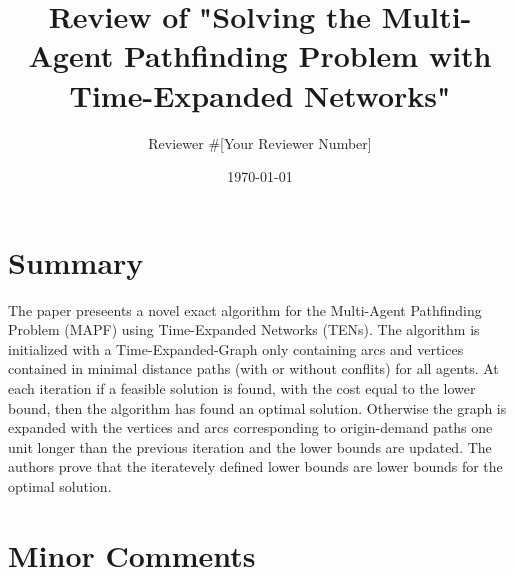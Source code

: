 \documentclass{article}
\begin{document}
\title{Review of "Solving the Multi-Agent Pathfinding Problem with Time-Expanded Networks"}
\author{Reviewer \#[Your Reviewer Number]}
\date{\today}

\maketitle

\section*{Summary}

The paper preseents a novel exact algorithm for the Multi-Agent Pathfinding Problem (MAPF) using Time-Expanded Networks (TENs).
The algorithm is initialized with a Time-Expanded-Graph only containing arcs and vertices contained in minimal distance paths (with or without conflits) for all agents.
At each iteration if a feasible solution is found, with the cost equal to the lower bound, then the algorithm has found an optimal solution. 
Otherwise the graph is expanded with the vertices and arcs corresponding to origin-demand paths one unit longer than the previous iteration and the lower bounds are updated.
The authors prove that the iteratevely defined lower bounds are lower bounds for the optimal solution.

\section*{Minor Comments}
\end{document}
